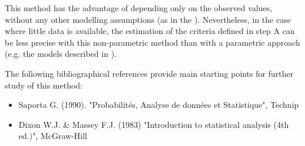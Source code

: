             {
              This method has the advantage of depending only on the observed values, without any other modelling assumptions (as in the ). Nevertheless, in the case where little data is available, the estimation of the criteria defined in step A can be less precise with this non-parametric method than with a parametric approach (e.g. the models described in ).

              The following bibliographical references provide main starting points for further study of this method:
              \begin{itemize}
              \item Saporta G. (1990). "Probabilités, Analyse de données et Statistique", Technip
              \item Dixon W.J. \& Massey F.J. (1983) "Introduction to statistical analysis (4th ed.)", McGraw-Hill
              \end{itemize}
            }
